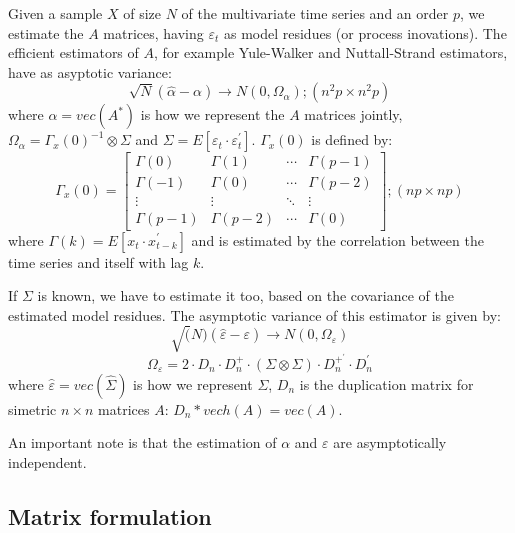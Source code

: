 \documentclass[a4paper,10pt]{article}
\begin{document}
Given a sample $X$ of size $N$ of the multivariate time series and an order $p$, we estimate the $A$ matrices, having $\varepsilon_{t}$ as model residues (or process inovations). The efficient estimators of $A$, for example Yule-Walker and Nuttall-Strand estimators, have as asyptotic variance:
\begin{equation}
\sqrt{N} (\hat{\alpha} - \alpha) \to N(0,\Omega_{\alpha}); (n^{2}p \times n^{2}p)
\end{equation}
where $\alpha = vec(A^{\ast})$ is how we represent the $A$ matrices jointly, $\Omega_{\alpha} = \Gamma_{x}(0)^{-1}\otimes \Sigma$ and $\Sigma = E[\varepsilon_{t}\cdot \varepsilon_{t}^{'}]$. $\Gamma_{x}(0)$ is defined by:
\begin{equation}
\Gamma_{x}(0) = \left[ \begin{array}{cccc} 
\Gamma(0) & \Gamma(1) & \cdots & \Gamma(p-1) \\
\Gamma(-1) & \Gamma(0) & \cdots & \Gamma(p-2) \\
\vdots & \vdots & \ddots & \vdots \\
\Gamma(p-1) & \Gamma(p-2) & \cdots & \Gamma(0) \end{array} \right]; (np \times np)
\end{equation}
where $\Gamma(k) = E[x_{t} \cdot x_{t-k}^{'}]$ and is estimated by the correlation between the time series and itself with lag $k$.

If $\Sigma$ is known, we have to estimate it too, based on the covariance of the estimated model residues. The asymptotic variance of this estimator is given by:
\begin{equation} 
\sqrt(N) (\hat{\varepsilon} - \varepsilon) \to N(0, \Omega_{\varepsilon})
\end{equation}
\begin{equation}
\Omega_{\varepsilon} = 2 \cdot D_{n} \cdot D_{n}^{+} \cdot (\Sigma \otimes \Sigma) \cdot D_{n}^{+^{'}} \cdot D_{n}^{'}
\end{equation}
where $\hat{\varepsilon} = vec(\hat{\Sigma})$ is how we represent $\Sigma$, $D_{n}$ is the duplication matrix for simetric $ n \times n$ matrices $A$: $D_{n}*vech(A) = vec(A)$.

An important note is that the estimation of $\alpha$ and $\varepsilon$ are asymptotically independent.

\subsection{Matrix formulation}
\end{document}
